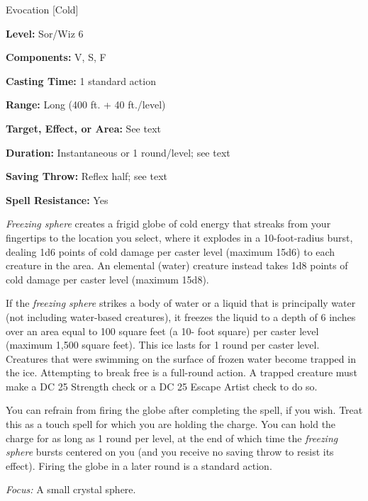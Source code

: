 
Evocation [Cold]

\textbf{Level:} Sor/Wiz 6

\textbf{Components:} V, S, F

\textbf{Casting Time:} 1 standard action

\textbf{Range:} Long (400 ft. + 40 ft./level)

\textbf{Target, Effect, or Area:} See text

\textbf{Duration:} Instantaneous or 1 round/level; see text

\textbf{Saving Throw:} Reflex half; see text

\textbf{Spell Resistance:} Yes

\textit{Freezing sphere} creates a frigid globe of cold energy that streaks from 
your fingertips to the location you select, where it explodes in a 10-foot-radius 
burst, dealing 1d6 points of cold damage per caster level (maximum 15d6) to each 
creature in the area. An elemental (water) creature instead takes 1d8 points of 
cold damage per caster level (maximum 15d8).

If the \textit{freezing sphere} strikes a body of water or a liquid that is principally 
water (not including water-based creatures), it freezes the liquid to a depth of 
6 inches over an area equal to 100 square feet (a 10- foot square) per caster level 
(maximum 1,500 square feet). This ice lasts for 1 round per caster level. Creatures 
that were swimming on the surface of frozen water become trapped in the ice. Attempting 
to break free is a full-round action. A trapped creature must make a DC 25 Strength 
check or a DC 25 Escape Artist check to do so.

You can refrain from firing the globe after completing the spell, if you wish. 
Treat this as a touch spell for which you are holding the charge. You can hold 
the charge for as long as 1 round per level, at the end of which time the \textit{freezing 
sphere} bursts centered on you (and you receive no saving throw to resist its effect). 
Firing the globe in a later round is a standard action.

\textit{Focus:} A small crystal sphere.

